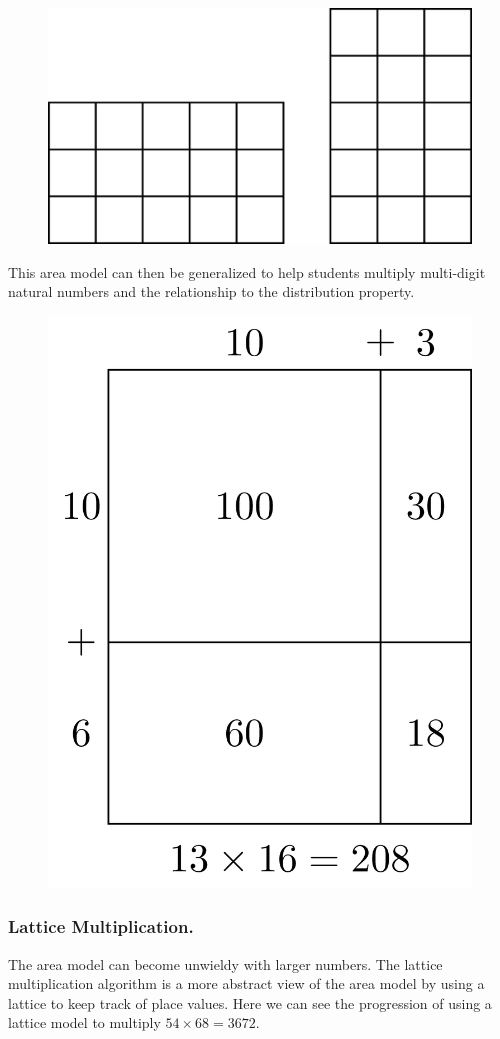 \documentclass[
]{book}
\theoremstyle{definition}
\theoremstyle{definition}
\theoremstyle{definition}
\theoremstyle{remark}
\begin{document}
\begin{figure}

{\centering \includegraphics[width=0.5\linewidth]{tikz/area-model-3by5} 

}

\end{figure}

This area model can then be generalized to help students multiply multi-digit natural numbers and the relationship to the distribution property.

\begin{figure}

{\centering \includegraphics[width=0.4\linewidth]{tikz/area-model-13-16} 

}

\end{figure}

\hypertarget{lattice-multiplication.}{%
\subsubsection*{Lattice Multiplication.}\label{lattice-multiplication.}}

The area model can become unwieldy with larger numbers. The lattice multiplication algorithm is a more abstract view of the area model by using a lattice to keep track of place values. Here we can see the progression of using a lattice model to multiply \(54 \times 68 = 3672\).
\end{document}

